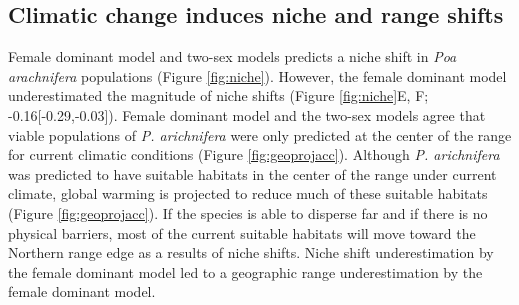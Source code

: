 \documentclass[12pt]{article}
\begin{document}
\subsection*{Climatic change induces niche and range shifts}
Female dominant model and  two-sex models predicts a niche shift in \emph{Poa arachnifera} populations (Figure \ref{fig:niche}). 
%  
However, the female dominant model underestimated the magnitude of niche shifts (Figure \ref{fig:niche}E, F; -0.16[-0.29,-0.03]).
Female dominant model and the two-sex models agree that viable populations of \emph{P. arichnifera} were only predicted at the center of the range for current climatic conditions (Figure \ref{fig:geoprojacc}).
Although \emph{P. arichnifera} was predicted to have suitable habitats in the center of the range under current climate, global  warming is projected to reduce much of these suitable habitats (Figure \ref{fig:geoprojacc}). 
If the species is able to disperse far and if there is no physical barriers, most of the current suitable habitats will move toward the Northern range edge as a results of niche shifts. 
Niche shift underestimation by the female dominant model led to a geographic range underestimation by the female dominant model.  
\end{document}
